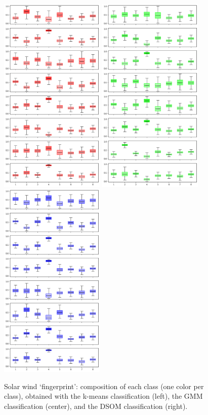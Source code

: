 \documentclass[utf8]{frontiersSCNS} %
\begin{document}
\begin{figure}[h!]
	\begin{center}
		\includegraphics[width=5cm]{Roberts/classesdatarange-kmeans}\hfill
		\includegraphics[width=5cm]{Roberts/classesdatarange-gmm}\hfill
		\includegraphics[width=5cm]{Roberts/classesdatarange-som}
	\end{center}
	\caption{Solar wind `fingerprint': composition of each class (one color per class), obtained with the k-means classification (left), the GMM classification (center), and the DSOM classification (right).}\label{fig:classesdatarange}
\end{figure}
\end{document}
